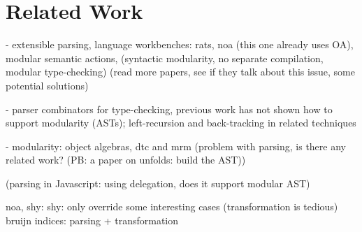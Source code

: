 \section{Related Work}\label{sec:relatedwork}

- extensible parsing, language workbenches: rats, noa (this one already uses OA), modular semantic actions, (syntactic modularity, no separate compilation, modular type-checking)
(read more papers, see if they talk about this issue, some potential solutions)

- parser combinators for type-checking, previous work has not shown how to support modularity (ASTs); left-recursion and back-tracking in related techniques

- modularity: object algebras, dtc and mrm (problem with parsing, is there any related work? (PB: a paper on unfolds: build the AST))

(parsing in Javascript: using delegation, does it support modular AST)

noa, shy: shy: only override some interesting cases (transformation is tedious)
bruijn indices: parsing + transformation
